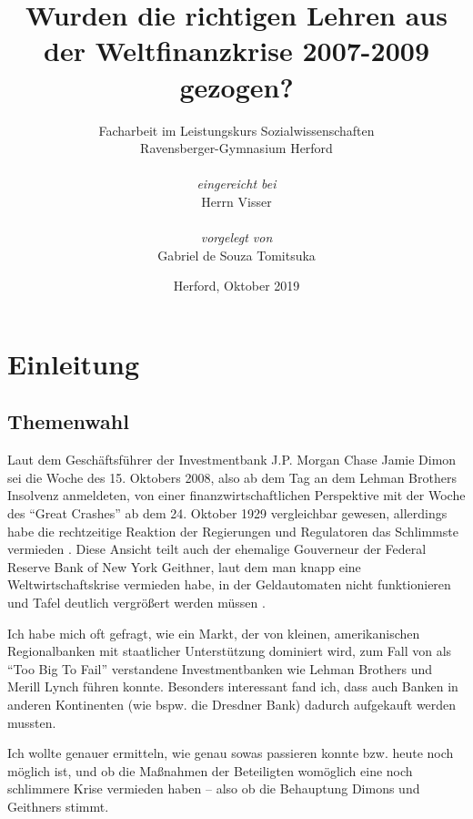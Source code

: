 \documentclass[a4paper,11pt]{report}
\begin{document}
\title{Wurden die richtigen Lehren aus der
    Weltfinanzkrise 2007-2009 gezogen?}
\author{%
    Facharbeit im Leistungskurs Sozialwissenschaften \\
    Ravensberger-Gymnasium Herford \\ \\
    \textit{eingereicht bei} \\
    Herrn Visser \\ \\
    \textit{vorgelegt von} \\
    Gabriel de Souza Tomitsuka 
    }
\date{Herford, Oktober 2019}
\maketitle
\cleardoublepage
{}
\tableofcontents
\cleardoublepage
{}
\chapter{Einleitung}
\section{Themenwahl}
Laut dem Gesch\"aftsf\"uhrer der Investmentbank J.P. Morgan
Chase Jamie Dimon sei die Woche des 15. Oktobers 2008, also ab dem
Tag an dem Lehman Brothers Insolvenz anmeldeten, von einer finanzwirtschaftlichen
Perspektive mit der Woche des \enquote{Great Crashes} ab dem 24. Oktober 1929 vergleichbar gewesen, allerdings habe die rechtzeitige Reaktion der Regierungen und
Regulatoren das Schlimmste vermieden \parencite{dimonyt}.
Diese Ansicht teilt auch der ehemalige Gouverneur der Federal
Reserve Bank of New York Geithner, laut dem man knapp eine
Weltwirtschaftskrise vermieden habe, in der Geldautomaten
nicht funktionieren und Tafel deutlich vergr\"oßert werden
m\"ussen \parencite{geithneryt}.

Ich habe mich oft gefragt, wie ein Markt, der
von kleinen, amerikanischen Regionalbanken mit
staatlicher Unterstützung
dominiert wird, zum Fall von als \enquote{Too Big To
Fail} verstandene Investmentbanken wie Lehman
Brothers und Merill Lynch
führen konnte. Besonders interessant fand ich,
dass auch Banken in anderen Kontinenten (wie
bspw. die Dresdner Bank) dadurch
aufgekauft werden mussten.

Ich wollte genauer
ermitteln, wie genau sowas passieren konnte
bzw. heute noch m\"oglich ist, und ob
die Maßnahmen der Beteiligten
womöglich eine noch schlimmere Krise
vermieden haben -- also ob die Behauptung Dimons
und Geithners stimmt.
\end{document}
